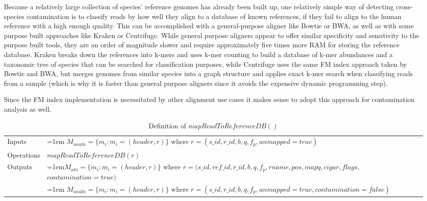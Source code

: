 Because a relatively large collection of species' reference genomes has already been built up, one relatively simple way of detecting cross-species contamination is to classify reads by how well they align to a database of known references, if they fail to align to the human reference with a high enough quality. This can be accomplished with a general-purpose aligner like Bowtie or BWA, as well as with some purpose built approaches like Kraken\autocite{wood2014kraken} or Centrifuge\autocite{kim2016centrifuge}. While general purpose aligners appear to offer similar specificity and sensitivity to the purpose built tools, they are an order of magnitude slower and require approximately five times more RAM for storing the reference database\autocite{kim2016centrifuge}. Kraken breaks down the references into k-mers and uses k-mer counting to build a database of k-mer abundances and a taxonomic tree of species that can be searched for classification purposes, while Centrifuge uses the same FM index approach taken by Bowtie and BWA, but merges genomes from similar species into a graph structure and applies exact k-mer search when classifying reads from a sample (which is why it is faster than general purpose aligners since it avoids the expensive dynamic programming step).

Since the FM index implementation is necessitated by other alignment use cases it makes sense to adopt this approach for contamination analysis as well. 

\bgroup
\def\arraystretch{1.5}
\begin{table}[!ht]
    \caption{Definition of $mapReadToReferenceDB()$}
    \label{tab:op_map_pair_to_reference_db}
    {\begin{tabular}{l|p{12cm}}
    \toprule
    Inputs & \hangindent=1em $M_{unaln} = \{m_i: m_i = (header, r)\} \text{  where } r = (s\_id, r\_id, b, q, f_p, unmapped=true)$\\
    \cline{2-2}
    Operations & $mapReadToReferenceDB(r)$\\
    \cline{2-2}
    \multirow{2}{*}{Outputs} & \hangindent=1em$M_{aln} = \{m_i: m_i = (header, r)\} \text{ where } r = (s\_id, ref\_id, r\_id, b, q, f_p, rname, pos, mapq, cigar, flags,$ $contamination=true)$\\
    & \hangindent=1em $M_{unaln} = \{m_i: m_i = (header, r)\} \text{  where } r = (s\_id, r\_id, b, q, f_p, unmapped=true, contamination=false)$\\
    \bottomrule
    \end{tabular}}
\end{table}
\egroup

